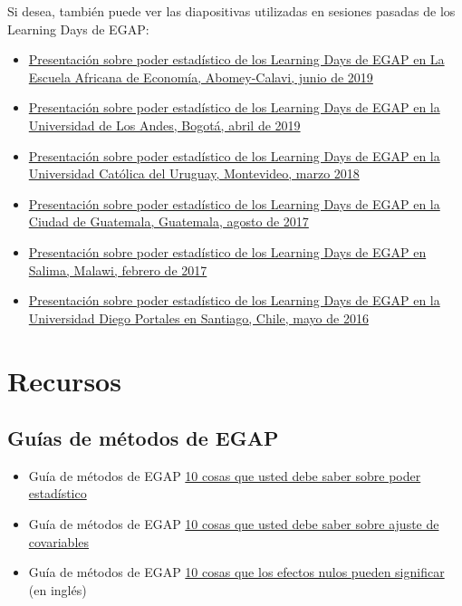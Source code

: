 \documentclass[12pt,spanish,]{book}
\begin{document}
Si desea, también puede ver las diapositivas utilizadas en sesiones pasadas de los Learning Days de EGAP:

\begin{itemize}
\item
  \href{https://egap.github.io/learningdays-resources/Slides/Examples/power-benin.pdf}{Presentación sobre poder estadístico de los Learning Days de EGAP en La Escuela Africana de Economía, Abomey-Calavi, junio de 2019}
\item
  \href{https://egap.github.io/learningdays-resources/Slides/Examples/power-bogota.pdf}{Presentación sobre poder estadístico de los Learning Days de EGAP en la Universidad de Los Andes, Bogotá, abril de 2019}
\item
  \href{https://egap.github.io/learningdays-resources/Slides/Examples/power-montevideo.pdf}{Presentación sobre poder estadístico de los Learning Days de EGAP en la Universidad Católica del Uruguay, Montevideo, marzo 2018}
\item
  \href{https://egap.github.io/learningdays-resources/Slides/Examples/power-guatemala.html}{Presentación sobre poder estadístico de los Learning Days de EGAP en la Ciudad de Guatemala, Guatemala, agosto de 2017}
\item
  \href{https://egap.github.io/learningdays-resources/Slides/Examples/power-malawi.pdf}{Presentación sobre poder estadístico de los Learning Days de EGAP en Salima, Malawi, febrero de 2017}
\item
  \href{https://egap.github.io/learningdays-resources/Slides/Examples/power-santiago.pdf}{Presentación sobre poder estadístico de los Learning Days de EGAP en la Universidad Diego Portales en Santiago, Chile, mayo de 2016}
\end{itemize}

\hypertarget{recursos-5}{%
\section{Recursos}\label{recursos-5}}

\hypertarget{guuxedas-de-muxe9todos-de-egap-4}{%
\subsection{Guías de métodos de EGAP}\label{guuxedas-de-muxe9todos-de-egap-4}}

\begin{itemize}
\item
  Guía de métodos de EGAP \href{https://egap.org/es/resource/10-cosas-que-debe-saber-sobre-poder-estadistico/}{10 cosas que usted debe saber sobre poder estadístico}
\item
  Guía de métodos de EGAP \href{https://egap.org/es/resource/10-cosas-que-debe-saber-sobre-ajuste-de-covariables/}{10 cosas que usted debe saber sobre ajuste de covariables}
\item
  Guía de métodos de EGAP \href{https://egap.org/resource/10-things-your-null-result-might-mean/}{10 cosas que los efectos nulos pueden significar} (en inglés)
\end{itemize}
\end{document}
